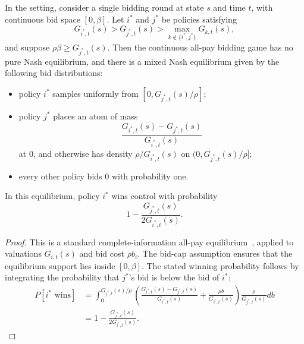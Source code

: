 \begin{theorem}
	In the \allpay setting, consider a single bidding round at state \(s\) and time \(t\), with continuous bid space \([0,\beta]\).
	Let \(i^*\) and \(j^*\) be policies satisfying
	\begin{equation}
		G_{i^*,t}(s)
		>
		G_{j^*,t}(s)
		>
		\max_{k\notin\{i^*,j^*\}}G_{k,t}(s),
	\end{equation}
	and suppose \(\rho\beta\geq G_{j^*,t}(s)\).
	Then the continuous all-pay bidding game has no pure Nash equilibrium, and there is a mixed Nash equilibrium given by the following bid distributions:
	\begin{itemize}
		\item policy \(i^*\) samples uniformly from \([0,G_{j^*,t}(s)/\rho]\);
		\item policy \(j^*\) places an atom of mass
		\begin{equation}
			\frac{G_{i^*,t}(s)-G_{j^*,t}(s)}
			{G_{i^*,t}(s)}
		\end{equation}
		at \(0\), and otherwise has density \(\rho/G_{i^*,t}(s)\) on \((0,G_{j^*,t}(s)/\rho]\);
		\item every other policy bids \(0\) with probability one.
	\end{itemize}
	In this equilibrium, policy \(i^*\) wins control with probability
	\begin{equation}
		1-\frac{G_{j^*,t}(s)}
		{2G_{i^*,t}(s)}.
	\end{equation}
\end{theorem}

\begin{proof}
	This is a standard complete-information all-pay equilibrium~\citep{baye1996all}, applied to valuations \(G_{i,t}(s)\) and bid cost \(\rho b_i\).
	The bid-cap assumption ensures that the equilibrium support lies inside \([0,\beta]\).
	The stated winning probability follows by integrating the probability that \(j^*\)'s bid is below the bid of \(i^*\):
	\begin{equation}
	\begin{aligned}
		P[i^*\text{ wins}]
		&=
		\int_0^{G_{j^*,t}(s)/\rho}
		\left(
			\frac{G_{i^*,t}(s)-G_{j^*,t}(s)}
			{G_{i^*,t}(s)}
			+
			\frac{\rho b}{G_{i^*,t}(s)}
		\right)
		\frac{\rho}{G_{j^*,t}(s)}
		db\\
		&=
		1-\frac{G_{j^*,t}(s)}
		{2G_{i^*,t}(s)}.
	\end{aligned}
	\end{equation}
\end{proof}

